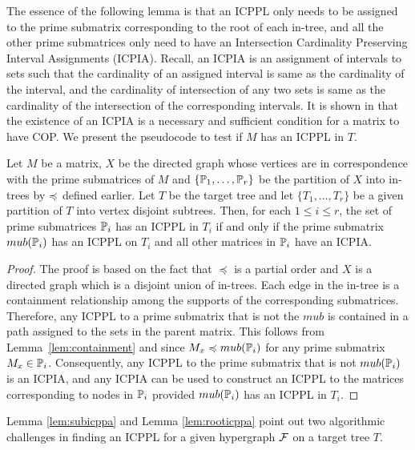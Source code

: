 The essence of the following lemma is that an ICPPL only needs to be
assigned to the prime submatrix corresponding to the root of each
in-tree, and all the other prime submatrices only need to have an
Intersection Cardinality Preserving Interval Assignments (ICPIA).
Recall, an ICPIA is an assignment of intervals to sets such that the
cardinality of an assigned interval is same as the cardinality of the
interval, and the cardinality of intersection of any two sets is same
as the cardinality of the intersection of the corresponding intervals.
It is shown in \cite{nsnrs09} that the existence of an ICPIA is a
necessary and sufficient condition for a matrix to have COP.  We
present the pseudocode to test if $M$ has an ICPPL in $T$.

\begin{lemma} 
  \label{lem:rooticppa}%
  Let $M$ be a matrix, $X$ be the directed graph whose vertices are in
  correspondence with the prime submatrices of $M$ and
  $\{\mathbb P_1,\ldots,\mathbb P_r\}$ be the partition of $X$ into in-trees by
  $\preccurlyeq$ defined earlier.  Let $T$ be the target tree and let
  $\{T_1, \ldots, T_r\}$ be a given partition of $T$ into vertex
  disjoint subtrees.  Then, for each $1 \leq i \leq r$, the set of
  prime submatrices $\mathbb P_i$ has an ICPPL in $T_i$ if and only if the
  prime submatrix $mub(\mathbb P_i)$ has an ICPPL on $T_i$ and all other
  matrices in $\mathbb P_i$ have an ICPIA.
\end{lemma}
\begin{proof}\thesisspacing
  The proof is based on the fact that $\preccurlyeq$ is a partial
  order and $X$ is a directed graph which is a disjoint union of
  in-trees.  Each edge in the in-tree is a containment relationship
  among the supports of the corresponding submatrices. Therefore, any
  ICPPL to a prime submatrix that is not the $mub$ is contained in a
  path assigned to the sets in the parent matrix.  This follows from
  Lemma~\ref{lem:containment} and since $M_x \preccurlyeq mub(\mathbb P_i)$
  for any prime submatrix $M_x \in \mathbb P_i$.  Consequently, any ICPPL to
  the prime submatrix that is not $mub(\mathbb P_i)$ is an ICPIA, and any
  ICPIA can be used to construct an ICPPL to the matrices
  corresponding to nodes in $\mathbb P_i$ provided $mub(\mathbb P_i)$ has
  an ICPPL in $T_i$. 
\end{proof}
Lemma \ref{lem:subicppa} and Lemma \ref{lem:rooticppa} point out two
algorithmic challenges in finding an ICPPL for a given hypergraph
${\cal F}$ on a target tree $T$.  
